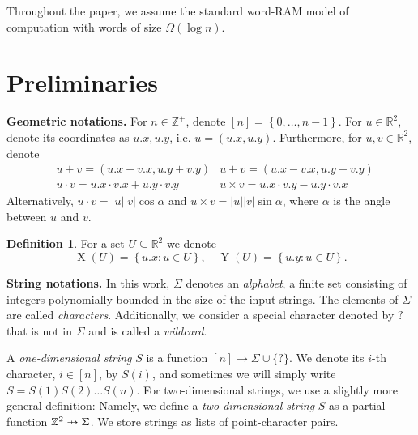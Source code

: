 \documentclass[11pt, letterpaper]{article}
\theoremstyle{plain}
\theoremstyle{definition}
\newtheorem{definition}{Definition}
\theoremstyle{remark}
\newcommand{\R}{\mathbb{R}}
\newcommand{\Z}{\mathbb{Z}}
\renewcommand{\phi}{\varphi}
\newcommand{\set}[1]{\left\lbrace #1 \right\rbrace}
\DeclareMathOperator*{\X}{X}
\DeclareMathOperator*{\Y}{Y}
\DeclareMathOperator*{\dom}{dom}
\DeclareMathOperator*{\chrome}{C}
\newcommand{\absolute}[1]{\left\lvert#1\right\rvert}
\begin{document}
\noindent Throughout the paper, we assume the standard word-RAM model of computation with words of size $\Omega(\log n)$.

\section{Preliminaries}
\label{sec:preliminaries}
\newcommand{\x}[1]{#1.x}
\newcommand{\y}[1]{#1.y}
\newcommand{\h}[1]{\phi \times #1}
\newcommand{\s}[1]{\psi \times #1}

\textbf{Geometric notations.} For $n \in \Z^+$, denote $[n] = \set{0, \dots, n - 1}$. For $u \in \R^2$, denote its coordinates as $\x{u}, \y{u}$, i.e. $u = (\x{u}, \y{u})$. Furthermore, for $u, v \in \R^2$, denote 
\begin{align*}
&u + v = (\x{u}+\x{v}, \y{u} + \y{v})  & u + v = (\x{u}-\x{v}, \y{u}-\y{v})\\
&u \cdot v = \x{u} \cdot \x{v} + \y{u} \cdot \y{v}  & u \times v = \x{u} \cdot \y{v} - \y{u} \cdot \x{v}
\end{align*}
Alternatively, $u \cdot v = \absolute{u}\absolute{v} \cos \alpha$ and $u \times v = \absolute{u}\absolute{v} \sin \alpha$, where $\alpha$ is the angle between $u$ and $v$.

\begin{definition}
	For a set $U \subseteq \R^2$ we denote
	\[ \X(U) = \set{\x{u} : u \in U}, \quad \Y(U) = \set{\y{u} : u \in U}.\]
\end{definition}


\newcommand{\wild}{\texttt{?}}
\noindent \textbf{String notations.} In this work, $\Sigma$ denotes an \emph{alphabet}, a finite set consisting of integers polynomially bounded in the size of the input strings. The elements of $\Sigma$ are called \emph{characters}. Additionally, we consider a special character denoted by $\wild$ that is not in $\Sigma$ and is called a \emph{wildcard}.

\newcommand{\getchar}[1]{\chrome(#1)}
\newcommand{\pto}{\mathrel{\ooalign{\hfil$\mapstochar\mkern5mu$\hfil\cr$\to$\cr}}}
\renewcommand{\d}[1]{\dom(#1)}
\newcommand{\f}[1]{#1^\mathbf{f}}

A \emph{one-dimensional string} $S$ is a function $[n] \rightarrow \Sigma \cup \{\wild\}$. We denote its $i$-th character, $i \in [n]$, by $S(i)$, and sometimes we will simply write $S = S(1) S(2) \ldots S(n)$. For two-dimensional strings, we use a slightly more general definition: Namely, we define a \emph{two-dimensional string} $S$ as a partial function $\Z^2 \pto \Sigma$. We store strings as lists of point-character pairs. 
\end{document}
